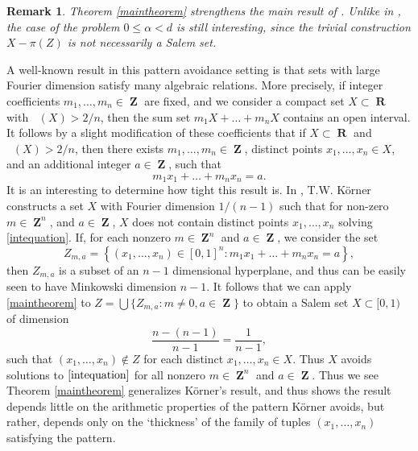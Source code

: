\documentclass[12pt,reqno]{article}
\DeclareMathOperator{\fordim}{\dim_{\mathbf{F}}}
\DeclareMathOperator{\RR}{\mathbf{R}}
\DeclareMathOperator{\ZZ}{\mathbf{Z}}
\newtheorem{remark}[theorem]{Remark}
\begin{document}
\begin{remark}
    Theorem \ref{maintheorem} strengthens the main result of \cite{OurPaper}. Unlike in \cite{OurPaper}, the case of the problem $0 \leq \alpha < d$ is still interesting, since the trivial construction $X - \pi(Z)$ is not necessarily a Salem set.
\end{remark}

A well-known result in this pattern avoidance setting is that sets with large Fourier dimension satisfy many algebraic relations. More precisely, if integer coefficients $m_1, \dots, m_n \in \ZZ$ are fixed, and we consider a compact set $X \subset \RR$ with $\fordim(X) > 2/n$, then the sum set $m_1 X + \dots + m_n X$ contains an open interval. It follows by a slight modification of these coefficients that if $X \subset \RR$ and $\fordim(X) > 2/n$, then there exists $m_1, \dots, m_n \in \ZZ$, distinct points $x_1, \dots, x_n \in X$, and an additional integer $a \in \ZZ$, such that
%
\begin{equation} \label{intequation}
    m_1 x_1 + \dots + m_n x_n = a.
\end{equation}
%
It is an interesting to determine how tight this result is. In \cite{Korner2}, T.W. K\"{o}rner constructs a set $X$ with Fourier dimension $1/(n-1)$ such that for non-zero $m \in \ZZ^n$, and $a \in \ZZ$, $X$ does not contain distinct points $x_1, \dots, x_n$ solving \eqref{intequation}. If, for each nonzero $m \in \ZZ^n$ and $a \in \ZZ$, we consider the set
%
\[ Z_{m,a} = \left\{ (x_1, \dots, x_n) \in [0,1]^n : m_1x_1 + \dots + m_n x_n = a \right\}, \]
%
then $Z_{m,a}$ is a subset of an $n-1$ dimensional hyperplane, and thus can be easily seen to have Minkowski dimension $n-1$. It follows that we can apply \ref{maintheorem} to $Z = \bigcup \{ Z_{m,a} : m \neq 0, a \in \ZZ \}$ to obtain a Salem set $X \subset [0,1)$ of dimension
%
\[ \frac{n - (n-1)}{n - 1} = \frac{1}{n-1}, \]
%
such that $(x_1, \dots, x_n) \not \in Z$ for each distinct $x_1, \dots, x_n \in X$. Thus $X$ avoids solutions to $\eqref{intequation}$ for all nonzero $m \in \ZZ^n$ and $a \in \ZZ$. Thus we see Theorem \ref{maintheorem} generalizes K\"{o}rner's result, and thus shows the result depends little on the arithmetic properties of the pattern K\"{o}rner avoids, but rather, depends only on the `thickness' of the family of tuples $(x_1, \dots, x_n)$ satisfying the pattern.
\end{document}
